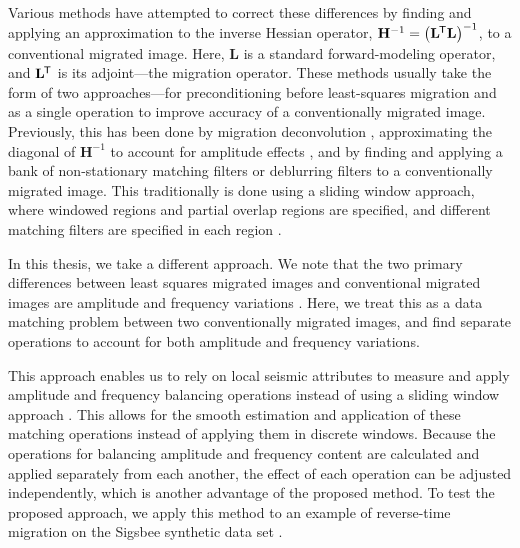     Various methods have attempted to correct these differences by finding and applying an approximation to the inverse Hessian operator, $\mathbf{H}^{-1} = \left (\mathbf{L}^{\mkern-1.5mu\mathsf{T}}\mathbf{L} \right )^{-1}$, to a conventional migrated image.
    Here, $\mathbf{L}$ is a standard forward-modeling operator, and $\mathbf{L}^{\mkern-1.5mu\mathsf{T}}$ is its adjoint---the migration operator.
    These methods usually take the form of two approaches---for preconditioning before least-squares migration and as a single operation to improve accuracy of a conventionally migrated image.
    Previously, this has been done by migration deconvolution \cite[]{poststack,prestack}, approximating the diagonal of $\mathbf{H}^{-1}$ to account for amplitude effects \cite[]{amp,diagamp}, and by finding and applying a bank of non-stationary matching filters \cite[]{imop,rtmmf} or deblurring filters \cite[]{debfilt} to a conventionally migrated image.
    This traditionally is done using a sliding window approach, where windowed regions and partial overlap regions are specified, and different matching filters are specified in each region \cite[]{seiinv}.

    In this thesis, we take a different approach. 
    We note that the two primary differences between least squares migrated images and conventional migrated images are amplitude and frequency variations \cite[]{Hou2015, Hou2016}. 
    Here, we treat this as a data matching problem between two conventionally migrated images, and find separate operations to account for both amplitude and frequency variations.

    This approach enables us to rely on local seismic attributes to measure and apply amplitude and frequency balancing operations instead of using a sliding window approach \cite[]{attr}.
This allows for the smooth estimation and application of these matching operations instead of applying them in discrete windows.
    Because the operations for balancing amplitude and frequency content are calculated and applied separately from each another, the effect of each operation can be adjusted independently, which is another advantage of the proposed method.
    To test the proposed approach, we apply this method to an example of reverse-time migration on the Sigsbee synthetic data set \cite[]{sigsbee}. 

